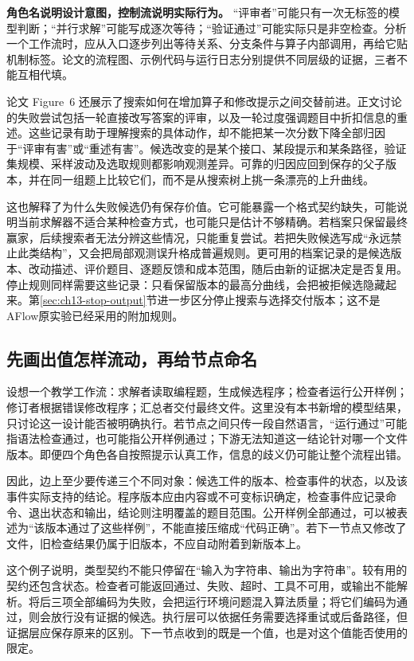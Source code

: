 \begin{principlebox}
\textbf{角色名说明设计意图，控制流说明实际行为。}
“评审者”可能只有一次无标签的模型判断；“并行求解”可能写成逐次等待；“验证通过”可能实际只是非空检查。分析一个工作流时，应从入口逐步列出等待关系、分支条件与算子内部调用，再给它贴机制标签。论文的流程图、示例代码与运行日志分别提供不同层级的证据，三者不能互相代填。
\end{principlebox}

论文 Figure~6 还展示了搜索如何在增加算子和修改提示之间交替前进。正文讨论的失败尝试包括一轮直接改写答案的评审，以及一轮过度强调题目中折扣信息的重述\cite{aflow-2410}。这些记录有助于理解搜索的具体动作，却不能把某一次分数下降全部归因于“评审有害”或“重述有害”。候选改变的是某个接口、某段提示和某条路径，验证集规模、采样波动及选取规则都影响观测差异。可靠的归因应回到保存的父子版本，并在同一组题上比较它们，而不是从搜索树上挑一条漂亮的上升曲线。

这也解释了为什么失败候选仍有保存价值。它可能暴露一个格式契约缺失，可能说明当前求解器不适合某种检查方式，也可能只是估计不够精确。若档案只保留最终赢家，后续搜索者无法分辨这些情况，只能重复尝试。若把失败候选写成“永远禁止此类结构”，又会把局部观测误升格成普遍规则。更可用的档案记录的是候选版本、改动描述、评价题目、逐题反馈和成本范围，随后由新的证据决定是否复用。停止规则同样需要这些记录：只看保留版本的最高分曲线，会把被拒候选隐藏起来。第\ref{sec:ch13-stop-output}节进一步区分停止搜索与选择交付版本；这不是AFlow原实验已经采用的附加规则。

\subsection{先画出值怎样流动，再给节点命名}
\label{sec:ch09-contractcase}

设想一个教学工作流：求解者读取编程题，生成候选程序；检查者运行公开样例；修订者根据错误修改程序；汇总者交付最终文件。这里没有本书新增的模型结果，只讨论这一设计能否被明确执行。若节点之间只传一段自然语言，“运行通过”可能指语法检查通过，也可能指公开样例通过；下游无法知道这一结论针对哪一个文件版本。即便四个角色各自按照提示认真工作，信息的歧义仍可能让整个流程出错。

因此，边上至少要传递三个不同对象：候选工件的版本、检查事件的状态，以及该事件实际支持的结论。程序版本应由内容或不可变标识确定，检查事件应记录命令、退出状态和输出，结论则注明覆盖的题目范围。公开样例全部通过，可以被表述为“该版本通过了这些样例”，不能直接压缩成“代码正确”。若下一节点又修改了文件，旧检查结果仍属于旧版本，不应自动附着到新版本上。

这个例子说明，类型契约不能只停留在“输入为字符串、输出为字符串”。较有用的契约还包含状态。检查者可能返回通过、失败、超时、工具不可用，或输出不能解析。将后三项全部编码为失败，会把运行环境问题混入算法质量；将它们编码为通过，则会放行没有证据的候选。执行层可以依据任务需要选择重试或后备路径，但证据层应保存原来的区别。下一节点收到的既是一个值，也是对这个值能否使用的限定。

